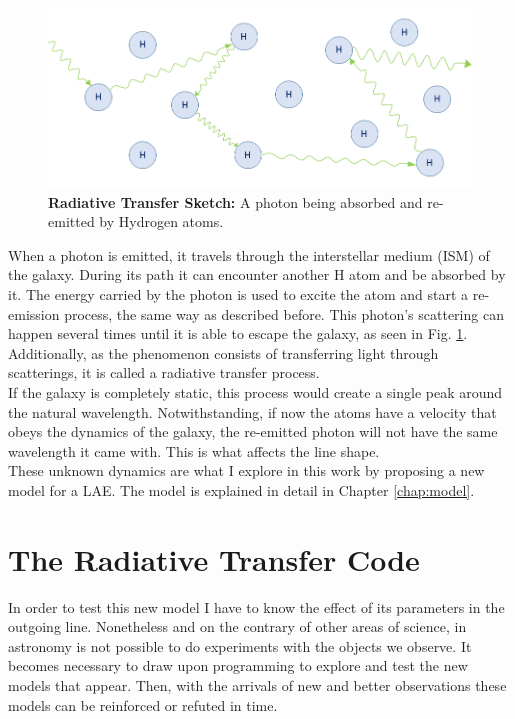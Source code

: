\begin{figure}[h!]
	\begin{center}
		\includegraphics[width=1\textwidth]{./figures/chapter1/radiative_transfer}
	\end{center}
	\caption{\textbf{Radiative Transfer Sketch:} A photon being absorbed and re-emitted by Hydrogen atoms. 
		\label{fig:radiative_transfer}}
\end{figure}

When a photon is emitted, it travels through the interstellar medium (ISM) of the galaxy. During its path it can encounter another H atom and be absorbed by it. The energy carried by the photon is used to excite the atom and start a re-emission process, the same way as described before. This photon's scattering can happen several times until it is able to escape the galaxy, as seen in Fig. \ref{fig:radiative_transfer}. Additionally, as the phenomenon consists of transferring light through scatterings, it is called a radiative transfer process.\\

If the galaxy is completely static, this process would create a single peak around the natural \lya wavelength. Notwithstanding, if now the atoms have a velocity that obeys the dynamics of the galaxy, the re-emitted photon will not have the same wavelength it came with. This is what affects the \lya line shape. \\

These unknown dynamics are what I explore in this work by proposing a new model for a LAE. The model is explained in detail in Chapter \ref{chap:model}. \\


\section{The Radiative Transfer Code}
In order to test this new model I have to know the effect of its parameters in the outgoing \lya line. Nonetheless and on the contrary of other areas of science, in astronomy is not possible to do experiments with the objects we observe. It becomes necessary to draw upon programming to explore and test the new models that appear. Then, with the arrivals of new and better observations these models can be reinforced or refuted in time. \\

